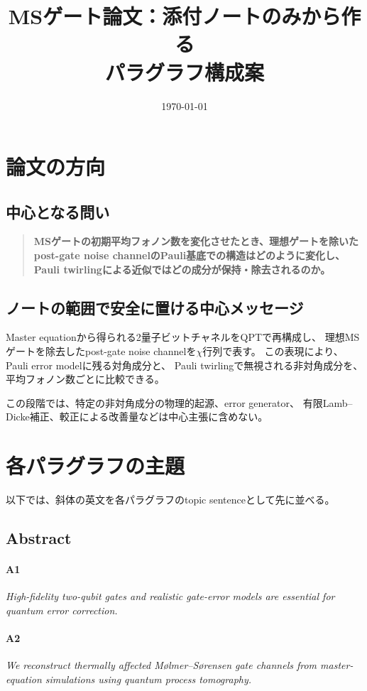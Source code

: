 \documentclass[dvipdfmx,a4paper,11pt]{jsarticle}
\title{MSゲート論文：添付ノートのみから作る\\パラグラフ構成案}
\author{}
\date{\today}
\newcommand{\topicsentence}[2]{%
  \paragraph{#1}\textit{#2}\par
}
\begin{document}
\maketitle

\section{論文の方向}

\subsection{中心となる問い}

\begin{quote}
\textbf{MSゲートの初期平均フォノン数を変化させたとき、理想ゲートを除いた
post-gate noise channelのPauli基底での構造はどのように変化し、
Pauli twirlingによる近似ではどの成分が保持・除去されるのか。}
\end{quote}

\subsection{ノートの範囲で安全に置ける中心メッセージ}

Master equationから得られる2量子ビットチャネルをQPTで再構成し、
理想MSゲートを除去したpost-gate noise channelを$\chi$行列で表す。
この表現により、Pauli error modelに残る対角成分と、
Pauli twirlingで無視される非対角成分を、平均フォノン数ごとに比較できる。

この段階では、特定の非対角成分の物理的起源、error generator、
有限Lamb--Dicke補正、較正による改善量などは中心主張に含めない。

\section{各パラグラフの主題}

以下では、斜体の英文を各パラグラフのtopic sentenceとして先に並べる。

\subsection{Abstract}

\topicsentence{A1}{High-fidelity two-qubit gates and realistic gate-error models are essential for quantum error correction.}

\topicsentence{A2}{We reconstruct thermally affected M{\o}lmer--S{\o}rensen gate channels from master-equation simulations using quantum process tomography.}
\end{document}
